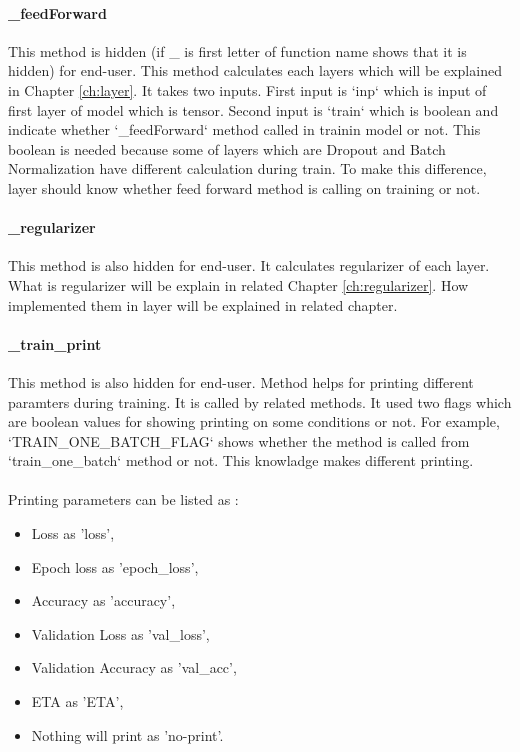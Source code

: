 \documentclass[12pt]{report}
\begin{document}
\paragraph{\_feedForward}
This method is hidden (if \_ is first letter of function name shows that it is hidden) for end-user. This method calculates each layers which will be explained in Chapter \ref{ch:layer}. It takes two inputs. First input is `inp` which is input of first layer of model which is tensor. Second input is `train` which is boolean and indicate whether `\_feedForward` method called in trainin model or not. This boolean is needed because some of layers which are Dropout and Batch Normalization have different calculation during train. To make this difference, layer should know whether feed forward method is calling on training or not.

\paragraph{\_regularizer}
This method is also hidden for end-user. It calculates regularizer of each layer. What is regularizer will be explain in related Chapter \ref{ch:regularizer}. How implemented them in layer will be explained in related chapter.

\paragraph{\_train\_print}
This method is also hidden for end-user. Method helps for printing different paramters during training. It is called by related methods. It used two flags which are boolean values for showing printing on some conditions or not. For example, `TRAIN\_ONE\_BATCH\_FLAG` shows whether the method is called from `train\_one\_batch` method or not. This knowladge makes different printing. 

\paragraph{}
Printing parameters can be listed as :

\begin{itemize}
	\item	 Loss                  as 'loss',
	\item	 Epoch loss            as 'epoch\_loss',
	\item	 Accuracy              as 'accuracy',
	\item	 Validation Loss       as 'val\_loss',
	\item	 Validation Accuracy   as 'val\_acc',
	\item	 ETA                   as 'ETA',
	\item    Nothing will print    as 'no-print'.
\end{itemize}
\end{document}
